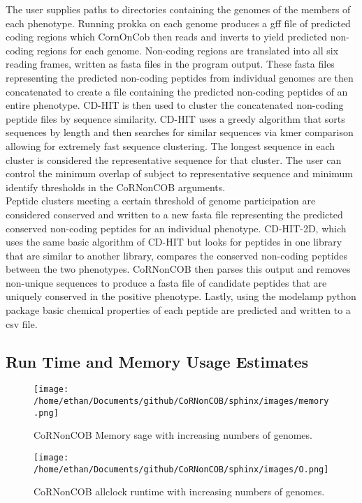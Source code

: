 \documentclass{article}
\begin{document}
The user supplies paths to directories containing the genomes of the members of each phenotype. Running prokka on each genome produces a gff file of predicted coding regions which CornOnCob then reads and inverts to yield predicted non-coding regions for each genome. Non-coding regions are translated into all six reading frames, written as fasta files in the program output. These fasta files representing the predicted non-coding peptides from individual genomes are then concatenated to create a file containing the predicted non-coding peptides of an entire phenotype. CD-HIT is then used to cluster the concatenated non-coding peptide files by sequence similarity. CD-HIT uses a greedy algorithm that sorts sequences by length and then searches for similar sequences via kmer comparison allowing for extremely fast sequence clustering. The longest sequence in each cluster is considered the representative sequence for that cluster. The user can control the minimum overlap of subject to representative sequence and minimum identify thresholds in the CoRNonCOB arguments. 
\\

Peptide clusters meeting a certain threshold of genome participation are considered conserved and written to a new fasta file representing the predicted conserved non-coding peptides for an individual phenotype. CD-HIT-2D, which uses the same basic algorithm of CD-HIT but looks for peptides in one library that are similar to another library, compares the conserved non-coding peptides between the two phenotypes. CoRNonCOB then parses this output and removes non-unique sequences to produce a fasta file of candidate peptides that are uniquely conserved in the positive phenotype. Lastly, using the modelamp python package basic chemical properties of each peptide are predicted and written to a csv file.

\subsection{Run Time and Memory Usage Estimates}


\begin{figure}[H]
  \centering
  \begin{minipage}[b]{0.45\textwidth}
  \label{memory}
    \texttt{[image: /home/ethan/Documents/github/CoRNonCOB/sphinx/images/memory.png]}
    \caption{CoRNonCOB Memory sage with increasing numbers of genomes.}
  \end{minipage}
  \hfill
  \begin{minipage}[b]{0.4\textwidth}
  \label{runtime}
    \texttt{[image: /home/ethan/Documents/github/CoRNonCOB/sphinx/images/O.png]}
    \caption{CoRNonCOB allclock runtime with increasing numbers of genomes.}
  \end{minipage}
\end{figure}
\end{document}
